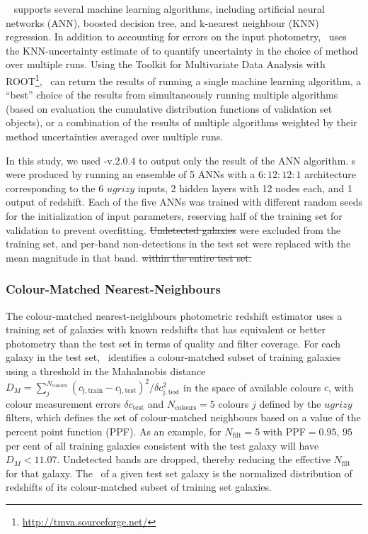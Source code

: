 \annz\ \citep{Sadeh:16} supports several machine learning algorithms, including artificial neural networks (ANN), boosted decision tree, and k-nearest neighbour (KNN) regression.
In addition to accounting for errors on the input photometry, \annz\ uses the KNN-uncertainty estimate of \citet{Oyaizu:08} to quantify uncertainty in the choice of method over multiple runs.
Using the Toolkit for Multivariate Data Analysis with ROOT\footnote{\url{http://tmva.sourceforge.net/}}, \annz\ can return the results of running a single machine learning algorithm, a ``best'' choice of the results from simultaneously running multiple algorithms (based on evaluation the cumulative distribution functions of validation set objects), or a combination of the results of multiple algorithms weighted by their method uncertainties averaged over multiple runs.

In this study, we used \annz-v.2.0.4 to output only the result of the ANN algorithm.
\Pzpdf s were produced by running an ensemble of 5 ANNs with a $6:12:12:1$ architecture corresponding to the 6 $ugrizy$ inputs, 2 hidden layers with 12 nodes each, and 1 output of redshift.
Each of the five ANNs was trained with different random seeds for the initialization of input parameters, reserving half of the training set for validation to prevent overfitting.
 \sout{Undetected galaxies} were excluded from the training set, and per-band non-detections in the test set were replaced with the mean magnitude  in that band. \sout{within the entire test set.}

\subsubsection{Colour-Matched Nearest-Neighbours}
\label{sec:cmnn}

The colour-matched nearest-neighbours photometric redshift estimator \citep[\cmnn,][]{Graham:17} uses a training set of galaxies with known redshifts that has equivalent or better photometry than the test set in terms of quality and filter coverage.
For each galaxy in the test set, \cmnn\ identifies a colour-matched subset of training galaxies using a threshold in the Mahalanobis distance $D_M = \sum_{j}^{N_{\mathrm{colours}}} (c_{\mathrm{j,train}} - c_{\mathrm{j,test}})^{2} / \delta c_{\mathrm{j,test}}^2$ in the space of available colours $c$, with colour measurement errors $\delta c_{\mathrm{test}}$ and $N_{\mathrm{colours}} = 5$ colours $j$ defined by the $ugrizy$ filters, which defines the set of colour-matched neighbours based on a value of the percent point function (PPF).
As an example, for $N_{\mathrm{filt}}=5$ with PPF$=0.95$, $95$ per cent of all training galaxies consistent with the test galaxy will have $D_M < 11.07$.
Undetected bands are dropped, thereby reducing the effective $N_{\mathrm{filt}}$ for that galaxy.
The \pzpdf\ of a given test set galaxy is the normalized distribution of redshifts of its colour-matched subset of training set galaxies.


